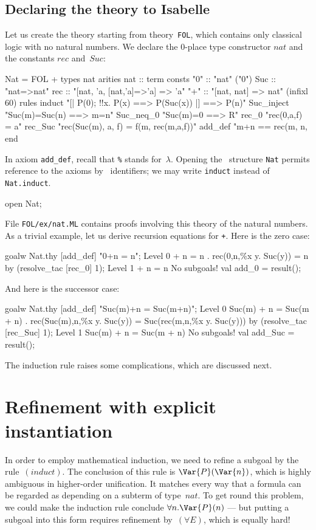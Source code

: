 \subsection{Declaring the theory to Isabelle}
Let us create the theory  starting from theory~\verb$FOL$,
which contains only classical logic with no natural numbers.  We declare
the 0-place type constructor $nat$ and the constants $rec$ and~$Suc$:
\begin{ttbox}
Nat = FOL +
types   nat
arities nat         :: term
consts  "0"         :: "nat"    ("0")
        Suc         :: "nat=>nat"
        rec         :: "[nat, 'a, [nat,'a]=>'a] => 'a"
        "+"         :: "[nat, nat] => nat"              (infixl 60)
rules   induct      "[| P(0);  !!x. P(x) ==> P(Suc(x)) |]  ==> P(n)"
        Suc_inject  "Suc(m)=Suc(n) ==> m=n"
        Suc_neq_0   "Suc(m)=0      ==> R"
        rec_0       "rec(0,a,f) = a"
        rec_Suc     "rec(Suc(m), a, f) = f(m, rec(m,a,f))"
        add_def     "m+n == rec(m, n, %
end
\end{ttbox}
In axiom {\tt add_def}, recall that \verb|%| stands for~$\lambda$.
Opening the \ML\ structure {\tt Nat} permits reference to the axioms by \ML\
identifiers; we may write {\tt induct} instead of {\tt Nat.induct}.
\begin{ttbox}
open Nat;
\end{ttbox}
File {\tt FOL/ex/nat.ML} contains proofs involving this theory of the
natural numbers.  As a trivial example, let us derive recursion equations
for \verb$+$.  Here is the zero case:
\begin{ttbox}
goalw Nat.thy [add_def] "0+n = n";
{\out Level 0}
{ + n = n}
{. rec(0,n,\%x y. Suc(y)) = n}
\ttbreak
by (resolve_tac [rec_0] 1);
{\out Level 1}
{ + n = n}
{\out No subgoals!}
val add_0 = result();
\end{ttbox}
And here is the successor case:
\begin{ttbox}
goalw Nat.thy [add_def] "Suc(m)+n = Suc(m+n)";
{\out Level 0}
{\out Suc(m) + n = Suc(m + n)}
{. rec(Suc(m),n,\%x y. Suc(y)) = Suc(rec(m,n,\%x y. Suc(y)))}
\ttbreak
by (resolve_tac [rec_Suc] 1);
{\out Level 1}
{\out Suc(m) + n = Suc(m + n)}
{\out No subgoals!}
val add_Suc = result();
\end{ttbox}
The induction rule raises some complications, which are discussed next.
\index{theories!defining|)}


\section{Refinement with explicit instantiation}
In order to employ mathematical induction, we need to refine a subgoal by
the rule~$(induct)$.  The conclusion of this rule is $\Var{P}(\Var{n})$,
which is highly ambiguous in higher-order unification.  It matches every
way that a formula can be regarded as depending on a subterm of type~$nat$.
To get round this problem, we could make the induction rule conclude
$\forall n.\Var{P}(n)$ --- but putting a subgoal into this form requires
refinement by~$(\forall E)$, which is equally hard!

